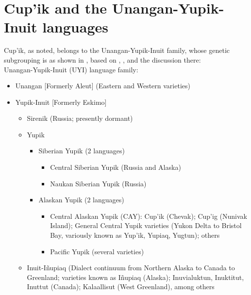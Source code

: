 \documentclass[output=paper]{langscibook}
\begin{document}
\section{Cup'ik and the Unangan-Yupik-Inuit languages} 
\label{sec:2}

Cup'ik, as noted, belongs to the Unangan-Yupik-Inuit family, whose genetic subgrouping is as shown in , based on \citet{Woodbury1984}, \citet{Fortescue2010}, and the discussion there: \\

\ea\label{ex:key:1}
Unangan-Yupik-Inuit (UYI) language family:
\begin{itemize}
    \item Unangan [Formerly Aleut] (Eastern and Western varieties)
    \item Yupik-Inuit [Formerly Eskimo]
    \begin{itemize}
        \item Sirenik (Russia; presently dormant)
        \item Yupik 
        \begin{itemize}
            \item Siberian Yupik (2 languages)
                    \begin{itemize}
                \item Central Siberian Yupik (Russia and Alaska)
                \item Naukan Siberian Yupik (Russia)
                    \end{itemize}
            \item Alaskan Yupik (2 languages)
                    \begin{itemize}
                \item Central Alaskan Yupik (CAY): Cup'ik (Chevak); Cup'ig (Nunivak Island); General Central Yupik varieties (Yukon Delta to Bristol Bay, variously known as Yup'ik, Yupiaq, Yugtun); others
                \item Pacific Yupik (several varieties)
                    \end{itemize}
        \end{itemize}
    \item Inuit-Iñupiaq (Dialect continuum from Northern Alaska to Canada to Greenland; varieties known as Iñupiaq (Alaska); Inuvialuktun, Inuktitut, Inuttut (Canada); Kalaallisut (West Greenland), among others
    \end{itemize}
\end{itemize}
\z
\end{document}
